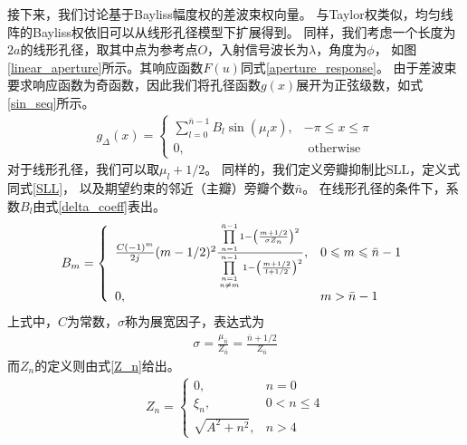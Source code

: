 \documentclass[master]{thesis-uestc}
\begin{document}
接下来，我们讨论基于Bayliss幅度权的差波束权向量。
与Taylor权类似，均匀线阵的Bayliss权依旧可以从线形孔径模型下扩展得到。
同样，我们考虑一个长度为$2a$的线形孔径，取其中点为参考点$O$，入射信号波长为$\lambda$，角度为$\phi$，
如图\ref{linear_aperture}所示。其响应函数$F(u)$同式\eqref{aperture_response}。
由于差波束要求响应函数为奇函数，因此我们将孔径函数$g(x)$展开为正弦级数，如式\eqref{sin_seq}所示。
\begin{equation}\label{sin_seq}
    \begin{aligned}
        g_{\Delta}(x)=\left\{\begin{array}{ll}
        \sum\limits_{l=0}^{\bar{n}-1} B_{l} \sin \left(\mu_{l} x\right), 
        & -\pi \leqslant x \leqslant \pi \\
        0, & \text { otherwise }
        \end{array}\right.
    \end{aligned}
\end{equation}
对于线形孔径，我们可以取$\mu_l+1/2$。
同样的，我们定义旁瓣抑制比$\text{SLL}$，定义式同式\eqref{SLL}，
以及期望约束的邻近（主瓣）旁瓣个数$\bar{n}$。
在线形孔径的条件下，系数$B_l$由式\eqref{delta_coeff}表出。
\begin{equation}\label{delta_coeff}
    \begin{aligned}
    B_{m}=\left\{\begin{array}{ll}
        \frac{C(-1)^{m}}{2 j}(m-1 / 2)^{2} \frac{\prod\limits_{n=1}^{\bar{n}-1} 
        1-\left(\frac{m+1 / 2}{\sigma Z_{n}}\right)^{2}}
        {\prod\limits_{n=1\atop n \neq m}^{n-1} 
        1-\left(\frac{m+1 / 2}{l+1 / 2}\right)^{2}}, & 0 \leqslant m \leqslant \bar{n}-1 \\
        0, & m>\bar{n}-1
        \end{array}\right.
    \end{aligned}
\end{equation}
上式中，$C$为常数，$\sigma$称为展宽因子，表达式为
\begin{equation}\label{delta_sigma}
    \begin{aligned}
       \sigma=\frac{\mu_{\bar{n}}}{Z_{\bar{n}}}=\frac{\bar{n}+1 / 2}{Z_{\bar{n}}}
    \end{aligned}
\end{equation}
而$Z_n$的定义则由式\eqref{Z_n}给出。
\begin{equation}\label{Z_n}
    \begin{aligned}
        Z_{n}=\left\{\begin{array}{ll}
                0, & n=0 \\
                \xi_{n}, & 0<n \leqslant 4 \\
                \sqrt{A^{2}+n^{2}}, & n>4
                \end{array}\right.
    \end{aligned}
\end{equation}
\end{document}
